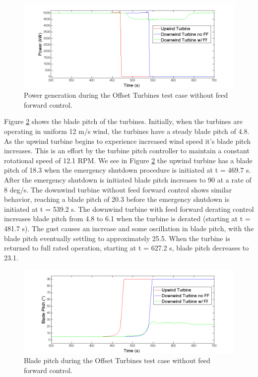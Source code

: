 \begin{figure}[ht] 
	\centering
		\includegraphics[width = \linewidth]{Figures/ch6Figures/fig6-16.png}
	\caption{Power generation during the Offset Turbines test case without feed forward control.}
	\label{fig6-16}
\end{figure}

Figure \ref{fig6-17} shows the blade pitch of the turbines. Initially, when the turbines are operating in uniform 12 m/s wind, the turbines have a steady blade pitch of 4.8\degree. As the upwind turbine begins to experience increased wind speed it's blade pitch increases. This is an effort by the turbine pitch controller to maintain a constant rotational speed of 12.1 RPM. We see in Figure \ref{fig6-17} the upwind turbine has a blade pitch of 18.3\degree{} when the emergency shutdown procedure is initiated at t = 469.7 s. After the emergency shutdown is initiated blade pitch increases to 90\degree{} at a rate of 8 deg/s. The downwind turbine without feed forward control shows similar behavior, reaching a blade pitch of 20.3\degree{} before the emergency shutdown is initiated at t = 539.2 s. The downwind turbine with feed forward derating control increases blade pitch from 4.8\degree{} to 6.1\degree{} when the turbine is derated (starting at t = 481.7 s). The gust causes an increase and some oscillation in blade pitch, with the blade pitch eventually settling to approximately 25.5\degree. When the turbine is returned to full rated operation, starting at t = 627.2 s, blade pitch decreases to 23.1\degree.

\begin{figure}[ht] 
	\centering
		\includegraphics[width = \linewidth]{Figures/ch6Figures/fig6-17.png}

	\caption{Blade pitch during the Offset Turbines test case without feed forward control.}
	\label{fig6-17}
\end{figure}

